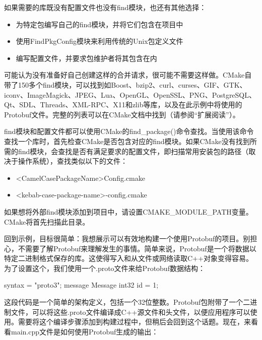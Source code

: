 如果需要的库既没有配置文件也没有find模块，也还有其他选择：

\begin{itemize}
\item
为特定包编写自己的find模块，并将它们包含在项目中

\item
使用FindPkgConfig模块来利用传统的Unix包定义文件

\item
编写配置文件，并要求包维护者将其包含在内
\end{itemize}

可能认为没有准备好自己创建这样的合并请求，很可能不需要这样做。CMake自带了150多个find模块，可以找到如Boost、bzip2、curl、curses、GIF、GTK、iconv、ImageMagick、JPEG、Lua、OpenGL、OpenSSL、PNG、PostgreSQL、Qt、SDL、Threads、XML-RPC、X11和zlib等库，以及在此示例中将使用的Protobuf文件。完整的列表可以在CMake文档中找到（请参阅“扩展阅读”）。

find模块和配置文件都可以使用CMake的find\_package()命令查找。当使用该命令查找一个库时，首先检查CMake是否包含对应的find模块。如果CMake没有找到所需的find模块，会查找是否有满足要求的配置文件，即扫描常用安装包的路径（取决于操作系统），查找类似以下的文件：

\begin{itemize}
\item
<CamelCasePackageName>Config.cmake

\item
<kebab-case-package-name>-config.cmake
\end{itemize}

如果想将外部find模块添加到项目中，请设置CMAKE\_MODULE\_PATH变量。CMake将首先扫描此目录。

回到示例，目标很简单：我想展示可以有效地构建一个使用Protobuf的项目。别担心，不需要了解Protobuf来理解发生的事情。简单来说，Protobuf是一个将数据以特定二进制格式保存的库。这使得写入和从文件或网络读取C++对象变得容易。为了设置这个，我们使用一个.proto文件来给Protobuf数据结构：


\begin{shell}
syntax = "proto3";
message Message {
    int32 id = 1;
}
\end{shell}

这段代码是一个简单的架构定义，包括一个32位整数。Protobuf包附带了一个二进制文件，可以将这些.proto文件编译成C++源文件和头文件，以便应用程序可以使用。需要将这个编译步骤添加到构建过程中，但稍后会回到这个话题。现在，来看看main.cpp文件是如何使用Protobuf生成的输出：

